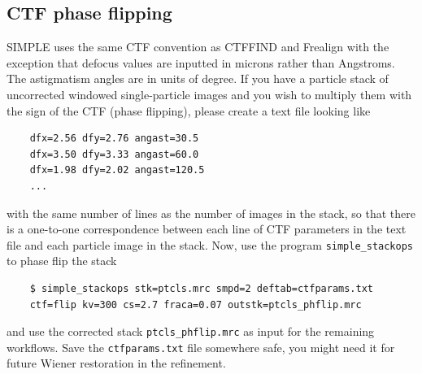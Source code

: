 \documentclass[a4paper,11pt]{article}
\newcommand{\prgname}[1]{\textcolor{NavyBlue}{\texttt{#1}}}
\begin{document}
\subsection{CTF phase flipping}
\label{ctfflip}
SIMPLE uses the same CTF convention as CTFFIND\citep{Mindell:2003aa} and Frealign\citep{Grigorieff:2007aa} with the exception that defocus values are inputted in microns rather than Angstroms. The astigmatism angles are in units of degree. If you have a particle stack of uncorrected windowed single-particle images and you wish to multiply them with the sign of the CTF (phase flipping), please create a text file looking like
\begin{verbatim}
    dfx=2.56 dfy=2.76 angast=30.5
    dfx=3.50 dfy=3.33 angast=60.0
    dfx=1.98 dfy=2.02 angast=120.5
    ...
\end{verbatim}
with the same number of lines as the number of images in the stack, so that there is a one-to-one correspondence between each line of CTF parameters in the text file and each particle image in the stack. Now, use the program \prgname{simple\_stackops} to phase flip the stack
\begin{verbatim}
    $ simple_stackops stk=ptcls.mrc smpd=2 deftab=ctfparams.txt 
    ctf=flip kv=300 cs=2.7 fraca=0.07 outstk=ptcls_phflip.mrc
\end{verbatim}
and use the corrected stack \texttt{ptcls\_phflip.mrc} as input for the remaining workflows. Save the \texttt{ctfparams.txt} file somewhere safe, you might need it for future Wiener restoration in the refinement.
\end{document}
